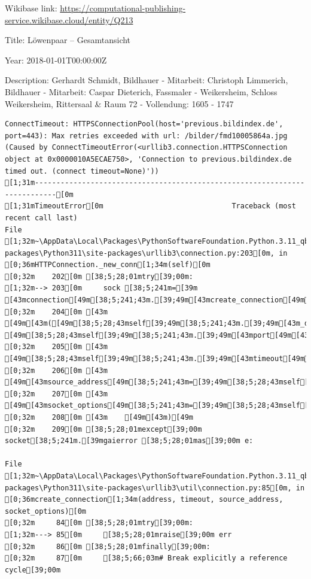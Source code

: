 \documentclass[
  letterpaper,
]{book}
\begin{document}
Wikibase link:
\url{https://computational-publishing-service.wikibase.cloud/entity/Q213}

Title: Löwenpaar -- Gesamtansicht

Year: 2018-01-01T00:00:00Z

Description: Gerhardt Schmidt, Bildhauer - Mitarbeit: Christoph
Limmerich, Bildhauer - Mitarbeit: Caspar Dieterich, Fassmaler -
Weikersheim, Schloss Weikersheim, Rittersaal \& Raum 72 - Vollendung:
1605 - 1747

\begin{verbatim}
ConnectTimeout: HTTPSConnectionPool(host='previous.bildindex.de', port=443): Max retries exceeded with url: /bilder/fmd10005864a.jpg (Caused by ConnectTimeoutError(<urllib3.connection.HTTPSConnection object at 0x0000010A5ECAE750>, 'Connection to previous.bildindex.de timed out. (connect timeout=None)'))
[1;31m---------------------------------------------------------------------------[0m
[1;31mTimeoutError[0m                              Traceback (most recent call last)
File [1;32m~\AppData\Local\Packages\PythonSoftwareFoundation.Python.3.11_qbz5n2kfra8p0\LocalCache\local-packages\Python311\site-packages\urllib3\connection.py:203[0m, in [0;36mHTTPConnection._new_conn[1;34m(self)[0m
[0;32m    202[0m [38;5;28;01mtry[39;00m:
[1;32m--> 203[0m     sock [38;5;241m=[39m [43mconnection[49m[38;5;241;43m.[39;49m[43mcreate_connection[49m[43m([49m
[0;32m    204[0m [43m        [49m[43m([49m[38;5;28;43mself[39;49m[38;5;241;43m.[39;49m[43m_dns_host[49m[43m,[49m[43m [49m[38;5;28;43mself[39;49m[38;5;241;43m.[39;49m[43mport[49m[43m)[49m[43m,[49m
[0;32m    205[0m [43m        [49m[38;5;28;43mself[39;49m[38;5;241;43m.[39;49m[43mtimeout[49m[43m,[49m
[0;32m    206[0m [43m        [49m[43msource_address[49m[38;5;241;43m=[39;49m[38;5;28;43mself[39;49m[38;5;241;43m.[39;49m[43msource_address[49m[43m,[49m
[0;32m    207[0m [43m        [49m[43msocket_options[49m[38;5;241;43m=[39;49m[38;5;28;43mself[39;49m[38;5;241;43m.[39;49m[43msocket_options[49m[43m,[49m
[0;32m    208[0m [43m    [49m[43m)[49m
[0;32m    209[0m [38;5;28;01mexcept[39;00m socket[38;5;241m.[39mgaierror [38;5;28;01mas[39;00m e:

File [1;32m~\AppData\Local\Packages\PythonSoftwareFoundation.Python.3.11_qbz5n2kfra8p0\LocalCache\local-packages\Python311\site-packages\urllib3\util\connection.py:85[0m, in [0;36mcreate_connection[1;34m(address, timeout, source_address, socket_options)[0m
[0;32m     84[0m [38;5;28;01mtry[39;00m:
[1;32m---> 85[0m     [38;5;28;01mraise[39;00m err
[0;32m     86[0m [38;5;28;01mfinally[39;00m:
[0;32m     87[0m     [38;5;66;03m# Break explicitly a reference cycle[39;00m


\end{verbatim}
\end{document}

